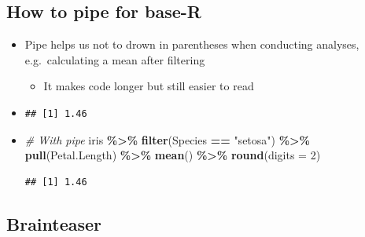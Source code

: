 \documentclass[
]{book}
\newenvironment{Shaded}{\begin{snugshade}}{\end{snugshade}}
\newcommand{\AttributeTok}[1]{\textcolor[rgb]{0.13,0.29,0.53}{#1}}
\newcommand{\CommentTok}[1]{\textcolor[rgb]{0.56,0.35,0.01}{\textit{#1}}}
\newcommand{\DecValTok}[1]{\textcolor[rgb]{0.00,0.00,0.81}{#1}}
\newcommand{\FunctionTok}[1]{\textcolor[rgb]{0.13,0.29,0.53}{\textbf{#1}}}
\newcommand{\NormalTok}[1]{#1}
\newcommand{\SpecialCharTok}[1]{\textcolor[rgb]{0.81,0.36,0.00}{\textbf{#1}}}
\newcommand{\StringTok}[1]{\textcolor[rgb]{0.31,0.60,0.02}{#1}}
\providecommand{\tightlist}{%
  \setlength{\itemsep}{0pt}\setlength{\parskip}{0pt}}
\begin{document}
\subsection{How to pipe for base-R}\label{how-to-pipe-for-base-r}

\begin{itemize}
\item
  Pipe helps us not to drown in parentheses when conducting analyses, e.g.~calculating a mean after filtering

  \begin{itemize}
  \tightlist
  \item
    It makes code longer but still easier to read
  \end{itemize}
\item
\begin{Shaded}
\end{Shaded}

\begin{verbatim}
## [1] 1.46
\end{verbatim}
\item
\begin{Shaded}
\begin{Highlighting}[]
\CommentTok{\# With pipe}
\NormalTok{iris }\SpecialCharTok{\%\textgreater{}\%} 
\FunctionTok{filter}\NormalTok{(Species }\SpecialCharTok{==} \StringTok{"setosa"}\NormalTok{) }\SpecialCharTok{\%\textgreater{}\%} 
\FunctionTok{pull}\NormalTok{(Petal.Length) }\SpecialCharTok{\%\textgreater{}\%}
\FunctionTok{mean}\NormalTok{() }\SpecialCharTok{\%\textgreater{}\%} \FunctionTok{round}\NormalTok{(}\AttributeTok{digits =} \DecValTok{2}\NormalTok{)}
\end{Highlighting}
\end{Shaded}

\begin{verbatim}
## [1] 1.46
\end{verbatim}
\end{itemize}

\subsection{\texorpdfstring{Brainteaser }{Brainteaser }}\label{brainteaser-2}
\end{document}
